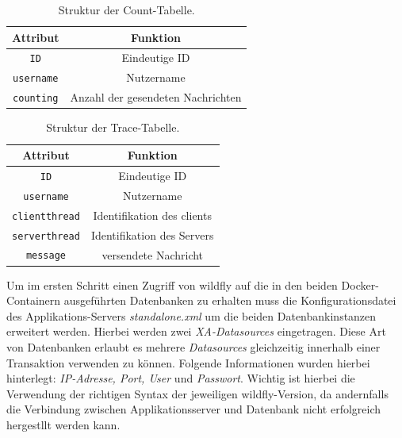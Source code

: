 \documentclass[10pt,journal,compsoc]{IEEEtran}
\begin{document}
\begin{table}[h!]
	\caption{Struktur der Count-Tabelle.}
	\label{tab:count}
	\def\arraystretch{1,2} %
	\centering
	\begin{tabular}{|c||c|}\hline
		\textbf{Attribut}  & \textbf{Funktion} \\\hline \hline
		\lstinline|ID|           & Eindeutige ID             \\ \hline
		\lstinline|username|       & Nutzername             \\ \hline
		\lstinline|counting|        & Anzahl der gesendeten Nachrichten             \\\hline
	\end{tabular} 
\end{table}
\begin{table}[h!]
	\caption{Struktur der Trace-Tabelle.}
	\label{tab:trace}
	\def\arraystretch{1,2} %
	\centering
	\begin{tabular}{|c||c|}\hline
		\textbf{Attribut}  & \textbf{Funktion} \\ \hline \hline
		\lstinline|ID|           & Eindeutige ID             \\ \hline
		\lstinline|username|       & Nutzername             \\ \hline
		\lstinline|clientthread|        & Identifikation des clients             \\ \hline
		\lstinline|serverthread|        & Identifikation des Servers           \\ \hline
		\lstinline|message|        & versendete Nachricht             \\\hline 
	\end{tabular} 
\end{table}


Um im ersten Schritt einen Zugriff von wildfly auf die in den beiden Docker-Containern ausgeführten Datenbanken zu erhalten muss die Konfigurationsdatei des Applikations-Servers \textit{standalone.xml} um die beiden Datenbankinstanzen erweitert werden. Hierbei werden zwei \textit{XA-Datasources} eingetragen. Diese Art von Datenbanken erlaubt es mehrere \textit{Datasources} gleichzeitig innerhalb einer Transaktion verwenden zu können. Folgende Informationen wurden hierbei hinterlegt: \textit{IP-Adresse, Port, User} und \textit{Passwort}. 
Wichtig ist hierbei die Verwendung der richtigen Syntax der jeweiligen wildfly-Version, da andernfalls die Verbindung zwischen Applikationsserver und Datenbank nicht erfolgreich hergestllt werden kann. 
\end{document}

